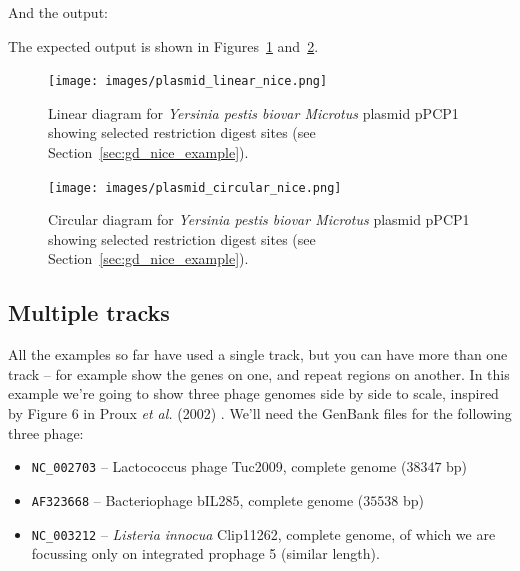 \begin{htmlonly}
\noindent And the output:



\end{htmlonly}
\begin{latexonly}
\noindent The expected output is shown in Figures~\ref{fig:plasmid_linear_nice}
and~\ref{fig:plasmid_circular_nice}.
\begin{figure}[htbp]
\centering
\texttt{[image: images/plasmid\_linear\_nice.png]}
\caption{Linear diagram for \textit{Yersinia pestis biovar Microtus} plasmid
pPCP1 showing selected restriction digest sites (see
Section~\ref{sec:gd_nice_example}).}
\label{fig:plasmid_linear_nice}
\end{figure}
\begin{figure}[htbp]
\centering
\texttt{[image: images/plasmid\_circular\_nice.png]}
\caption{Circular diagram for \textit{Yersinia pestis biovar Microtus} plasmid
pPCP1 showing selected restriction digest sites (see
Section~\ref{sec:gd_nice_example}).}
\label{fig:plasmid_circular_nice}
\end{figure}
\end{latexonly}

\subsection{Multiple tracks}
\label{sec:gd_multiple_tracks}

All the examples so far have used a single track, but you can have more than
one track -- for example show the genes on one, and repeat regions on another.
In this example we're going to show three phage genomes side by side to scale,
inspired by Figure 6 in Proux \textit{et al.} (2002) \cite{proux2002}.
We'll need the GenBank files for the following three phage:
\begin{itemize}
\item \verb|NC_002703| -- Lactococcus phage Tuc2009, complete genome ($38347$ bp)
\item \verb|AF323668| -- Bacteriophage bIL285, complete genome ($35538$ bp)
\item \verb|NC_003212| -- \textit{Listeria innocua} Clip11262, complete genome,
of which we are focussing only on integrated prophage 5 (similar length).
\end{itemize}

